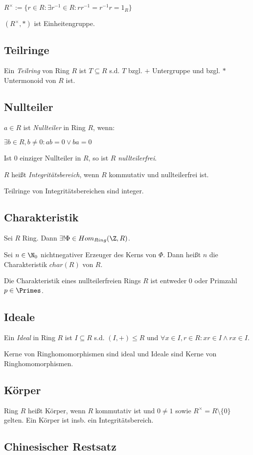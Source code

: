 $R^\times := \{ r \in R : \exists r^{-1} \in R : r r^{-1} = r^{-1} r = 1_R \}$

$(R^\times, *)$ ist Einheitengruppe.

\subsection*{Teilringe}

Ein \emph{Teilring} von Ring $R$ ist $T \subseteq R$ s.d. $T$ bzgl. $+$ Untergruppe und bzgl. $*$ Untermonoid von $R$ ist.

\subsection*{Nullteiler}

$a \in R$ ist \emph{Nullteiler} in Ring $R$, wenn:

$\exists b \in R, b \neq 0 : ab = 0 \lor ba = 0$

Ist $0$ einziger Nullteiler in $R$, so ist $R$ \emph{nullteilerfrei}.

$R$ heißt \emph{Integritätsbereich}, wenn $R$ kommutativ und nullteilerfrei ist.

Teilringe von Integritätsbereichen sind integer.

\subsection*{Charakteristik}

Sei $R$ Ring. Dann $\exists! \Phi \in Hom_{Ring}(\Z,R)$.

Sei $n \in \N_0$ nichtnegativer Erzeuger des Kerns von $\Phi$. Dann heißt $n$ die Charakteristik $char(R)$ von $R$.

Die Charakteristik eines nullteilerfreien Rings $R$ ist entweder $0$ oder Primzahl $p \in \Primes$.

\subsection*{Ideale}

Ein \emph{Ideal} in Ring $R$ ist $I \subseteq R$ s.d. $(I,+) \leq R$ und $\forall x \in I, r \in R : xr \in I \land rx \in I$.

Kerne von Ringhomomorphismen sind ideal und Ideale sind Kerne von Ringhomomorphismen.

\subsection*{Körper}

Ring $R$ heißt Körper, wenn $R$ kommutativ ist und $0 \neq 1$ sowie $R^\times = R \setminus \{0\}$ gelten. Ein Körper ist insb. ein Integritätsbereich.

\subsection*{Chinesischer Restsatz}
